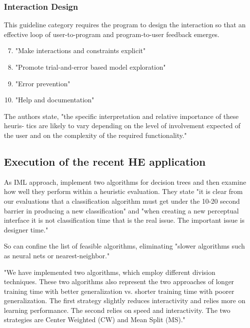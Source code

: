 \documentclass[sigchi]{acmart}
\begin{document}
\subsubsection{Interaction Design}
This guideline category requires the program to design the interaction so that an effective loop of user-to-program and program-to-user feedback emerges.
\begin{enumerate}
    \setcounter{enumi}{6}
    \item "Make interactions and constraints explicit" \\
    \item "Promote trial-and-error based model exploration" \\
    \item "Error prevention" \\
    \item "Help and documentation"\cite{imlheur2018} \\
\end{enumerate}

The authors state, "the specific interpretation and relative importance of these heuris-
tics are likely to vary depending on the level of involvement expected
of the user and on the complexity of the required functionality."\cite{imlheur2018}

\subsection{Execution of the recent HE application}
As IML approach, \citeauthor{imlheur2018} implement two algorithms for decision trees and then examine how well they perform within a heuristic evaluation. They state "it  is  clear  from  our  evaluations that a classification algorithm must get under the 10-20  second  barrier  in  producing  a  new  classification" and "when creating a new perceptual interface it  is  not  classification  time  that  is  the  real  issue. The important issue is designer time."

So \citeauthor{imlheur2018} can confine the list of feasible algorithms, eliminating "slower algorithms such as neural nets or nearest-neighbor."

"We   have   implemented   two   algorithms,   which   employ   different   division   techniques.   These   two   algorithms   also   represent  the  two  approaches  of  longer  training  time  with  better  generalization  vs.  shorter  training  time  with  poorer  generalization. The first strategy slightly reduces interactivity and  relies  more  on  learning  performance.    The  second  relies  on  speed  and  interactivity.    The  two  strategies  are  Center  Weighted (CW) and Mean Split (MS)."\cite{imlheur2018}
\end{document}
